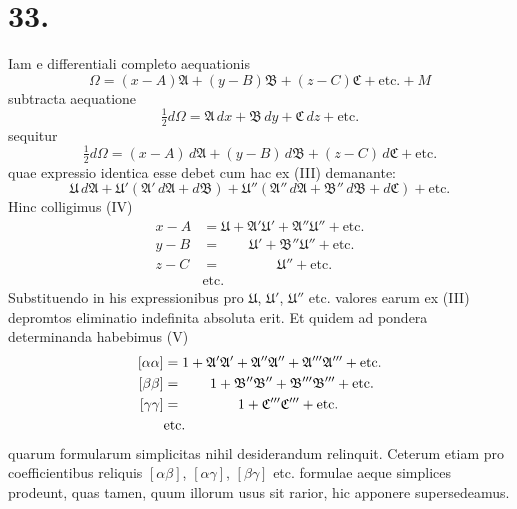 \documentclass[12pt,a4paper]{book}
\begin{document}
\section*{33.}
\label{sec:art33}

Iam e differentiali completo aequationis
%
\begin{equation*}
\Omega=(x-A)\mathfrak{A}+(y-B)\mathfrak{B}+(z-C)\mathfrak{C}+\text{etc.}+M
\end{equation*}
subtracta aequatione
%
\begin{equation*}
\tfrac{1}{2}d\Omega=\mathfrak{A}\,dx+\mathfrak{B}\,dy+\mathfrak{C}\,dz+\text{etc.}
\end{equation*}
sequitur
%
\begin{equation*}
\tfrac{1}{2}d\Omega=(x-A)\,d\mathfrak{A}+(y-B)\,d\mathfrak{B}+(z-C)\,d\mathfrak{C}+\text{etc.}
\end{equation*}
quae expressio identica esse debet cum hac ex (III) demanante:
%
\begin{equation*}
\mathfrak{U}\,d\mathfrak{A}+\mathfrak{U}'(\mathfrak{A}'\,d\mathfrak{A}+d\mathfrak{B})+\mathfrak{U}''(\mathfrak{A}''\,d\mathfrak{A}+\mathfrak{B}''\,d\mathfrak{B}+d\mathfrak{C})+\text{etc.}
\end{equation*}
Hinc colligimus (IV)
%
\begin{equation*}
\begin{aligned}
x-A&=\mathfrak{U}+\mathfrak{A}'\mathfrak{U}'+\mathfrak{A}''\mathfrak{U}''+\text{etc.}\\
y-B&=\qquad\mathfrak{U}'+\mathfrak{B}''\mathfrak{U}''+\text{etc.}\\
z-C&=\qquad\qquad\mathfrak{U}''+\text{etc.}\\
&\text{etc.}
\end{aligned}
\end{equation*}
Substituendo in his expressionibus pro $\mathfrak{U}$, $\mathfrak{U}'$, $\mathfrak{U}''$ etc. valores earum ex (III) depromtos eliminatio indefinita absoluta erit. Et quidem ad pondera determinanda habebimus (V)
%
\begin{equation*}
\begin{aligned}
\relax[\alpha\alpha]&=1+\mathfrak{A}'\mathfrak{A}'+\mathfrak{A}''\mathfrak{A}''+\mathfrak{A}'''\mathfrak{A}'''+\text{etc.}\\
\relax[\beta\beta]&=\qquad 1+\mathfrak{B}''\mathfrak{B}''+\mathfrak{B}'''\mathfrak{B}'''+\text{etc.}\\
\relax[\gamma\gamma]&=\qquad\qquad 1+\mathfrak{C}'''\mathfrak{C}'''+\text{etc.}\\
&\text{etc.}
\end{aligned}
\end{equation*}
quarum formularum simplicitas nihil desiderandum relinquit. Ceterum etiam pro coefficientibus reliquis $[\alpha\beta]$, $[\alpha\gamma]$, $[\beta\gamma]$ etc. formulae aeque simplices prodeunt, quas tamen, quum illorum usus sit rarior, hic apponere supersedeamus.
\end{document}
